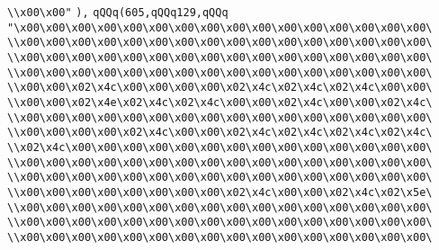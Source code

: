 \verb|\\x00\x00"|\newline
\verb|),|\newline
\verb|qQQq(605,qQQq129,qQQq|\newline
\verb|"\x00\x00\x00\x00\x00\x00\x00\x00\x00\x00\x00\x00\x00\x00\x00\x00\|\newline
\verb|\\x00\x00\x00\x00\x00\x00\x00\x00\x00\x00\x00\x00\x00\x00\x00\x00\|\newline
\verb|\\x00\x00\x00\x00\x00\x00\x00\x00\x00\x00\x00\x00\x00\x00\x00\x00\|\newline
\verb|\\x00\x00\x00\x00\x00\x00\x00\x00\x00\x00\x00\x00\x00\x00\x00\x00\|\newline
\verb|\\x00\x00\x02\x4c\x00\x00\x00\x00\x02\x4c\x02\x4c\x02\x4c\x00\x00\|\newline
\verb|\\x00\x00\x02\x4e\x02\x4c\x02\x4c\x00\x00\x02\x4c\x00\x00\x02\x4c\|\newline
\verb|\\x00\x00\x00\x00\x00\x00\x00\x00\x00\x00\x00\x00\x00\x00\x00\x00\|\newline
\verb|\\x00\x00\x00\x00\x02\x4c\x00\x00\x02\x4c\x02\x4c\x02\x4c\x02\x4c\|\newline
\verb|\\x02\x4c\x00\x00\x00\x00\x00\x00\x00\x00\x00\x00\x00\x00\x00\x00\|\newline
\verb|\\x00\x00\x00\x00\x00\x00\x00\x00\x00\x00\x00\x00\x00\x00\x00\x00\|\newline
\verb|\\x00\x00\x00\x00\x00\x00\x00\x00\x00\x00\x00\x00\x00\x00\x00\x00\|\newline
\verb|\\x00\x00\x00\x00\x00\x00\x00\x00\x02\x4c\x00\x00\x02\x4c\x02\x5e\|\newline
\verb|\\x00\x00\x00\x00\x00\x00\x00\x00\x00\x00\x00\x00\x00\x00\x00\x00\|\newline
\verb|\\x00\x00\x00\x00\x00\x00\x00\x00\x00\x00\x00\x00\x00\x00\x00\x00\|\newline
\verb|\\x00\x00\x00\x00\x00\x00\x00\x00\x00\x00\x00\x00\x00\x00\x00\x00\|\newline
